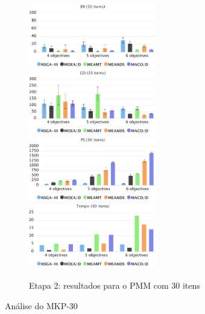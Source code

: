 \begin{figure}[!htbp]
	\caption{Etapa 2: resultados para o PMM com 30 itens}
	\label{fig_exp2_mkp_30}
	\includegraphics[width=0.5\textwidth]{cap_experimentos/figs/etapa2/er-mkp-30}
	\includegraphics[width=0.5\textwidth]{cap_experimentos/figs/etapa2/gd-mkp-30}
	\includegraphics[width=0.5\textwidth]{cap_experimentos/figs/etapa2/ps-mkp-30}
	\includegraphics[width=0.5\textwidth]{cap_experimentos/figs/etapa2/time-mkp-30}
\end{figure}

Análise do MKP-30

